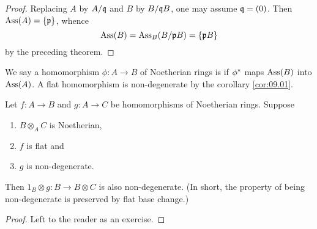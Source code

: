\documentclass[../main]{subfiles}
\begin{document}
\begin{proof}
Replacing $A$ by $A/\mathfrak{q}$ and $B$ by $B/\mathfrak{q}B$, one may assume $\mathfrak{q} = (0)$. Then $\operatorname{Ass}(A) = \{\mathfrak{p}\}$, whence \[\operatorname{Ass}(B) = \operatorname{Ass}_B(B/\mathfrak{p}B) = \{\mathfrak{p}B\}\] by the preceding theorem.
\end{proof}

\newparagraph We say a homomorphism $\phi: A \longrightarrow B$ of Noetherian rings is  if $\phi^\ast$ maps $\operatorname{Ass}(B)$ into $\operatorname{Ass}(A)$. A flat homomorphism is non-degenerate by the corollary \ref{cor:09.01}.

\begin{proposition}\label{pro:09.02}
Let $f: A\longrightarrow B$ and $g: A \longrightarrow C$ be homomorphisms of Noetherian rings. Suppose 
\begin{enumerate}[label = \arabic*)]
    \item $B\otimes_AC$ is Noetherian,
    \item $f$ is flat and 
    \item $g$ is non-degenerate.
\end{enumerate}
Then $1_B\otimes g: B\longrightarrow B\otimes C$ is also non-degenerate. (In short, the property of being non-degenerate is preserved by flat base change.)
\end{proposition}

\begin{proof}
Left to the reader as an exercise. 
\end{proof}
\end{document}
